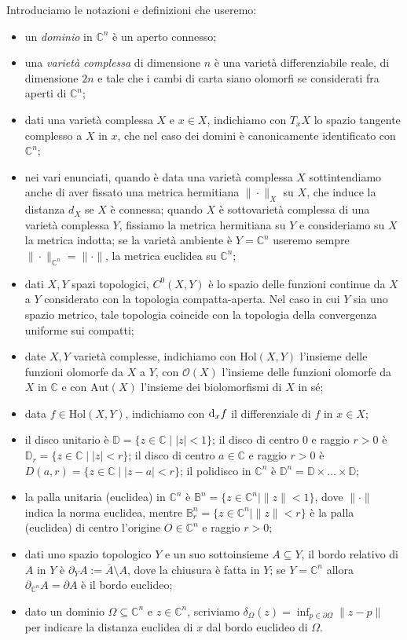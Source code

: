 Introduciamo le notazioni e definizioni che useremo:
\begin{itemize}
    \item  un \textit{dominio} in $\mathbb{C}^n$ è un aperto connesso;
    \item una \textit{varietà complessa} di dimensione $n$ è una varietà differenziabile reale, di dimensione $2n$ e tale che i cambi di carta siano olomorfi se considerati fra aperti di $\mathbb{C}^n$;
    \item dati una varietà complessa $X$ e $x \in X$, indichiamo con $T_xX$ lo spazio tangente complesso a $X$ in $x$, che nel caso dei domini è canonicamente identificato con $\mathbb{C}^n$;
    \item nei vari enunciati, quando è data una varietà complessa $X$ sottintendiamo anche di aver fissato una metrica hermitiana $\|\cdot\|_X$ su $X$, che induce la distanza $d_X$ se $X$ è connessa; quando $X$ è sottovarietà complessa di una varietà complessa $Y$, fissiamo la metrica hermitiana su $Y$ e consideriamo su $X$ la metrica indotta; se la varietà ambiente è $Y=\mathbb{C}^n$ useremo sempre $\|\cdot\|_{\mathbb{C}^n}=\|\cdot\|$, la metrica euclidea su $\mathbb{C}^n$;
    \item dati $X,Y$ spazi topologici, $C^0(X,Y)$ è lo spazio delle funzioni continue da $X$ a $Y$ considerato con la topologia compatta-aperta. Nel caso in cui $Y$ sia uno spazio metrico, tale topologia coincide con la topologia della convergenza uniforme sui compatti;
    \item date $X,Y$ varietà complesse, indichiamo con $\text{Hol}(X,Y)$ l'insieme delle funzioni olomorfe da $X$ a $Y$, con $\mathcal{O}(X)$ l'insieme delle funzioni olomorfe da $X$ in $\mathbb{C}$ e con $\text{Aut}(X)$ l'insieme dei biolomorfismi di $X$ in sé;
    \item data $f \in \text{Hol}(X,Y)$, indichiamo con $\mathop{}\!\mathrm{d}_x f$ il differenziale di $f$ in $x \in X$;
    \item il disco unitario è $\mathbb{D}=\{z \in \mathbb{C} \mid |z|<1\}$; il disco di centro $0$ e raggio $r>0$ è $\mathbb{D}_r=\{z \in \mathbb{C} \mid |z|<r\}$; il disco di centro $a\in\mathbb{C}$ e raggio $r>0$ è $D(a,r)=\{z\in\mathbb{C}\mid |z-a|<r\}$; il polidisco in $\mathbb{C}^n$ è $\mathbb{D}^n=\mathbb{D}\times\dots\times\mathbb{D}$;
    \item la palla unitaria (euclidea) in $\mathbb{C}^n$ è $\mathbb{B}^n=\{z \in \mathbb{C}^n \mid \|z\|<1\}$, dove $\|\cdot\|$ indica la norma euclidea, mentre $\mathbb{B}_r^n=\{z \in \mathbb{C}^n \mid \|z\|<r\}$ è la palla (euclidea) di centro l'origine $O\in\mathbb{C}^n$ e raggio $r>0$;
    \item dati uno spazio topologico $Y$ e un suo sottoinsieme $A\subseteq Y$, il bordo relativo di $A$ in $Y$ è $\partial_Y A:=\overline{A}\setminus A$, dove la chiusura è fatta in $Y$; se $Y=\mathbb{C}^n$ allora $\partial_{\mathbb{C}^n}A=\partial A$ è il bordo euclideo;
    \item dato un dominio $\Omega\subseteq\mathbb{C}^n$ e $z \in \mathbb{C}^n$, scriviamo $\delta_\Omega(z)=\displaystyle\inf_{p \in \partial\Omega}\|z-p\|$ per indicare la distanza euclidea di $x$ dal bordo euclideo di $\Omega$.
\end{itemize}

